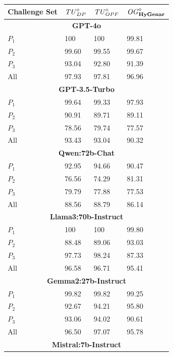 \begin{table}
\centering
\begin{tabularx}{\textwidth}{l X X X}
\toprule
\textbf{Challenge Set} & \textbf{$\mathit{TU}^\diamond_{DP}$} & \textbf{$\mathit{TU}^\diamond_{OPF}$} & \textbf{$\mathit{OG}^\diamond_{\textbf{HyGenar}}$} \\
\midrule
\multicolumn{4}{c}{\small\textbf{GPT-4o}} \\
\midrule
$P_1$ 
& 100 
& 100 
& 99.81 \\
$P_2$ 
& 99.60 
& 99.55 
& 99.67 \\
$P_3$ 
& 93.04 
& 92.80
& 91.39\\
All 
& 97.93 
& 97.81 
& 96.96 \\
\midrule
\multicolumn{4}{c}{\small\textbf{GPT-3.5-Turbo}} \\
\midrule
$P_1$ 
& 99.64
& 99.33
& 97.93\\
$P_2$ 
& 90.91 
& 89.71 
& 89.11\\
$P_3$ 
& 78.56 
& 79.74 
& 77.57\\
All 
& 93.43 
& 93.04 
& 90.32\\
\midrule
\multicolumn{4}{c}{\small\textbf{Qwen:72b-Chat}} \\
\midrule
$P_1$ 
& 92.95 
& 94.66
& 90.47\\
$P_2$ 
& 76.56
& 74.29 
& 81.31 \\
$P_3$ 
& 79.79
& 77.88
& 77.53\\
All 
& 88.56
& 88.79
& 86.14\\
\midrule
\multicolumn{4}{c}{\small\textbf{Llama3:70b-Instruct}} \\
\midrule
$P_1$ 
& 100 
& 100
& 99.80\\
$P_2$ 
& 88.48 
& 89.06
& 93.03\\
$P_3$ 
& 97.73
& 98.24
& 87.33\\
All 
& 96.58
& 96.71
& 95.41\\
\midrule
\multicolumn{4}{c}{\small\textbf{Gemma2:27b-Instruct}} \\
\midrule
$P_1$ 
& 99.82 
& 99.82 
& 99.25\\
$P_2$ 
& 92.67 
& 94.21 
& 95.80\\
$P_3$ 
& 93.06
& 94.02
& 90.61\\
All 
& 96.50
& 97.07
& 95.78\\
\midrule
\multicolumn{4}{c}{\small\textbf{Mistral:7b-Instruct}} \\

\end{tabularx}
\end{table}
